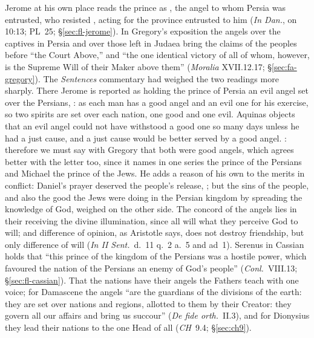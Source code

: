 Jerome at his own place reads the prince as , the angel to whom Persia was entrusted, who resisted , acting for the province entrusted to him (\emph{In
Dan.}, on 10:13; PL~25; \S\ref{sec:fl-jerome}). In Gregory's exposition the
angels over the captives in Persia and over those left in Judaea bring the
claims of the peoples before ``the Court Above,'' and ``the one identical
victory of all of whom, however, is the Supreme Will of their Maker above
them'' (\emph{Moralia} XVII.12.17; \S\ref{sec:fa-gregory}). The
\emph{Sentences} commentary had weighed the two readings more sharply. There Jerome is
reported as holding the prince of Persia an evil angel set over the
Persians, : as each man has a good angel and an evil one for his
exercise, so two spirits are set over each nation, one good and one evil.
Aquinas objects that an evil angel could not have withstood a good
one so many days unless he had a just cause, and a just cause would be
better served by a good angel. :
therefore we must say with Gregory that both were good angels, which agrees
better with the letter too, since it names in one series the prince of the
Persians and Michael the prince of the Jews. He adds a reason of his own
to the merits in conflict: Daniel's prayer deserved the people's release,
; but
the sins of the people, and also the good the Jews were doing in the Persian
kingdom by spreading the knowledge of God, weighed on the other side. The
concord of the angels lies in their receiving the divine illumination, since
all will what they perceive God to will; and difference of opinion, as
Aristotle says, does not destroy friendship, but only difference of will
(\emph{In II Sent.}\ d.~11 q.~2 a.~5 and ad~1). Serenus in Cassian holds that
``this prince of the kingdom of the Persians was a hostile power, which
favoured the nation of the Persians an enemy of God's people'' (\emph{Conl.}\
VIII.13; \S\ref{sec:fl-cassian}). That the nations have their angels the
Fathers teach with one voice; for Damascene the angels ``are the guardians of
the divisions of the earth: they are set over nations and regions, allotted
to them by their Creator: they govern all our affairs and bring us succour''
(\emph{De fide orth.}\ II.3), and for Dionysius they lead their nations to
the one Head of all (\emph{CH}~9.4; \S\ref{sec:ch9}).

